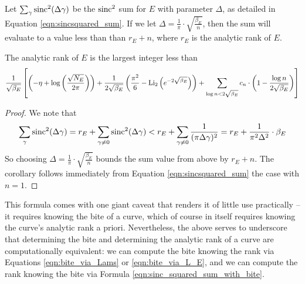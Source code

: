 \begin{theorem}
Let $\sum_{\gamma} \text{sinc}^2(\Delta \gamma)$ be the $\text{sinc}^2$ sum for $E$ with parameter $\Delta$, as detailed in Equation \ref{eqn:sincsquared_sum}. If we let $\Delta = \frac{1}{\pi}\cdot \sqrt{\frac{\beta_E}{n}}$, then the sum will evaluate to a value less than than $r_E+n$, where $r_E$ is the analytic rank of $E$.
\end{theorem}
\begin{corollary}\label{cor:sinc_squared_sum_with_bite}
The analytic rank of $E$ is the largest integer less than
\begin{equation}\label{eqn:sinc_squared_sum_with_bite}
\frac{1}{\sqrt{\beta_E}}\left[\left(-\eta + \log\left(\frac{\sqrt{N_E}}{2\pi}\right)\right)+ \frac{1}{2 \sqrt{\beta_E}}\left(\frac{\pi^2}{6} - \text{Li}_2\left(e^{-2\sqrt{\beta_E}}\right)\right) + \sum_{\log n<2\sqrt{\beta_E}} c_n \cdot \left(1-\frac{\log n}{2\sqrt{\beta_E}}\right)\right]
\end{equation}
\end{corollary}
\begin{proof}
We note that 
\begin{equation}
\sum_{\gamma} \text{sinc}^2(\Delta \gamma) = r_E + \sum_{\gamma\ne 0} \text{sinc}^2(\Delta \gamma) <  r_E + \sum_{\gamma\ne 0} \frac{1}{(\pi \Delta \gamma)^2} = r_E + \frac{1}{\pi^2 \Delta^2} \cdot \beta_E
\end{equation}
So choosing $\Delta = \frac{1}{\pi}\cdot \sqrt{\frac{\beta_E}{n}}$ bounds the sum value from above by $r_E + n$. The corollary follows immediately from Equation \ref{eqn:sincsquared_sum} the case with $n=1$.
\end{proof}

This formula comes with one giant caveat that renders it of little use practically -- it requires knowing the bite of a curve, which of course in itself requires knowing the curve's analytic rank a priori. Nevertheless, the above serves to underscore that determining the bite and determining the analytic rank of a curve are computationally equivalent: we can compute the bite knowing the rank via Equations \ref{eqn:bite_via_Lams} or \ref{eqn:bite_via_L_E}, and we can compute the rank knowing the bite via Formula \ref{eqn:sinc_squared_sum_with_bite}. \\


